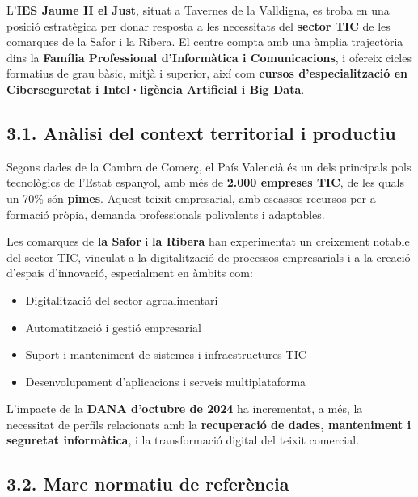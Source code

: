 \documentclass[
  paper=a4,
  ,captions=tableheading
]{scrartcl}
\providecommand{\tightlist}{%
  \setlength{\itemsep}{0pt}\setlength{\parskip}{0pt}}
\begin{document}
L'\textbf{IES Jaume II el Just}, situat a Tavernes de la Valldigna, es
troba en una posició estratègica per donar resposta a les necessitats
del \textbf{sector TIC} de les comarques de la Safor i la Ribera. El
centre compta amb una àmplia trajectòria dins la \textbf{Família
Professional d'Informàtica i Comunicacions}, i ofereix cicles formatius
de grau bàsic, mitjà i superior, així com \textbf{cursos
d'especialització en Ciberseguretat i Intel·ligència Artificial i Big
Data}.

\hypertarget{anuxe0lisi-del-context-territorial-i-productiu}{%
\subsection{3.1. Anàlisi del context territorial i
productiu}\label{anuxe0lisi-del-context-territorial-i-productiu}}

Segons dades de la Cambra de Comerç, el País Valencià és un dels
principals pols tecnològics de l'Estat espanyol, amb més de
\textbf{2.000 empreses TIC}, de les quals un 70\% són \textbf{pimes}.
Aquest teixit empresarial, amb escassos recursos per a formació pròpia,
demanda professionals polivalents i adaptables.

Les comarques de \textbf{la Safor} i \textbf{la Ribera} han experimentat
un creixement notable del sector TIC, vinculat a la digitalització de
processos empresarials i a la creació d'espais d'innovació, especialment
en àmbits com:

\begin{itemize}
\tightlist
\item
  Digitalització del sector agroalimentari
\item
  Automatització i gestió empresarial
\item
  Suport i manteniment de sistemes i infraestructures TIC
\item
  Desenvolupament d'aplicacions i serveis multiplataforma
\end{itemize}

L'impacte de la \textbf{DANA d'octubre de 2024} ha incrementat, a més,
la necessitat de perfils relacionats amb la \textbf{recuperació de
dades, manteniment i seguretat informàtica}, i la transformació digital
del teixit comercial.

\hypertarget{marc-normatiu-de-referuxe8ncia}{%
\subsection{3.2. Marc normatiu de
referència}\label{marc-normatiu-de-referuxe8ncia}}
\end{document}
